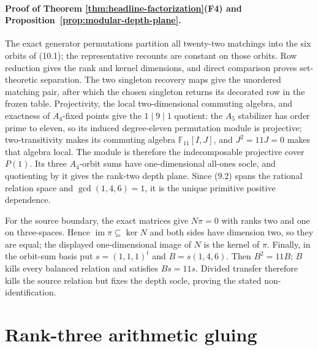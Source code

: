\documentclass[11pt]{article}
\theoremstyle{definition}
\theoremstyle{remark}
\newcommand{\F}{\mathbb{F}}
\begin{document}
\paragraph{Proof of Theorem \ref{thm:headline-factorization}(F4) and
Proposition~\ref{prop:modular-depth-plane}.}
The exact generator permutations partition all twenty-two matchings into
the six orbits of (10.1); the representative recounts are constant on
those orbits.  Row reduction gives the rank and kernel dimensions, and
direct comparison proves set-theoretic separation.  The two singleton
recovery maps give the unordered matching pair, after which the chosen
singleton returns its decorated row in the frozen table.  Projectivity,
the local two-dimensional commuting algebra, and exactness of
$A_4$-fixed points give the $1\mid9\mid1$ quotient: the $A_5$ stabilizer
has order prime to eleven, so its induced degree-eleven permutation module
is projective; two-transitivity makes its commuting algebra
$\F_{11}[I,J]$, and $J^2=11J=0$ makes that algebra local.  The module is
therefore the indecomposable projective cover $P(1)$.  Its three
$A_4$-orbit sums have one-dimensional all-ones socle, and quotienting by
it gives the rank-two depth plane.  Since (9.2) spans the rational
relation space and $\gcd(1,4,6)=1$, it is the unique primitive positive
dependence.

For the source boundary, the exact matrices give $N\pi=0$ with ranks two
and one on three-spaces.  Hence
$\operatorname{im}\pi\subseteq\ker N$ and both sides have dimension two,
so they are equal; the displayed one-dimensional image of $N$ is the
kernel of $\pi$.  Finally, in the orbit-sum basis put
$s=(1,1,1)^t$ and $B=s(1,4,6)$.  Then $B^2=11B$; $B$ kills every
balanced relation and satisfies $Bs=11s$.  Divided transfer therefore
kills the source relation but fixes the depth socle, proving the stated
non-identification.

\section{Rank-three arithmetic gluing}
\label{sec:gluing}
\end{document}
